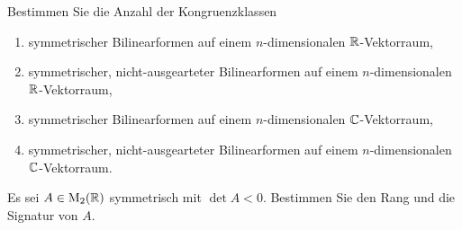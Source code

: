 \documentclass[a4paper, 10pt]{scrartcl}
\begin{document}





\begin{question}
  Bestimmen Sie die Anzahl der Kongruenzklassen
  \begin{enumerate}
    \item
      symmetrischer Bilinearformen auf einem $n$-dimensionalen $\mathbb{R}$-Vektorraum,
    \item
      symmetrischer, nicht-ausgearteter Bilinearformen auf einem $n$-dimensionalen $\mathbb{R}$-Vektorraum,
    \item
      symmetrischer Bilinearformen auf einem $n$-dimensionalen $\mathbb{C}$-Vektorraum,
    \item
      symmetrischer, nicht-ausgearteter Bilinearformen auf einem $n$-dimensionalen $\mathbb{C}$-Vektorraum.
  \end{enumerate}
\end{question}





\begin{question}
  Es sei $A \in \operatorname{M}_{2}(\mathbb{R})$ symmetrisch mit $\det A < 0$.
  Bestimmen Sie den Rang und die Signatur von $A$.
\end{question}
\end{document}
